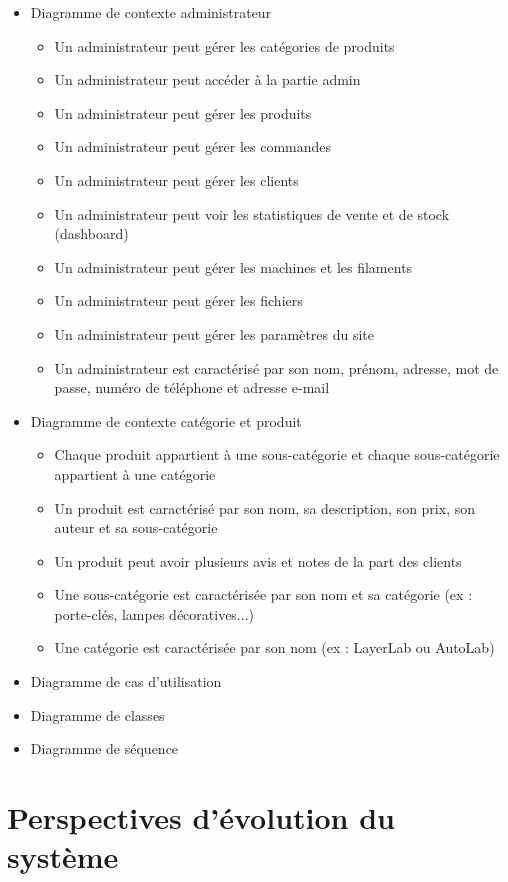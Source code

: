 \documentclass[12pt,a4paper]{article}
\begin{document}
\begin{itemize}
\item Diagramme de contexte administrateur 
\begin{itemize}[label=\textbullet]
    \item Un administrateur peut gérer les catégories de produits
    \item Un administrateur peut accéder à la partie admin 
    \item Un administrateur peut gérer les produits
    \item Un administrateur peut gérer les commandes
    \item Un administrateur peut gérer les clients
    \item Un administrateur peut voir les statistiques de vente et de stock (dashboard)
    \item Un administrateur peut gérer les machines et les filaments
    \item Un administrateur peut gérer les fichiers
    \item Un administrateur peut gérer les paramètres du site
    \item Un administrateur est caractérisé par son nom, prénom, adresse, mot de passe, numéro de téléphone et adresse e-mail
\end{itemize}

\item Diagramme de contexte catégorie et produit  
\begin{itemize}[label=\textbullet]
    \item Chaque produit appartient à une sous-catégorie et chaque sous-catégorie appartient à une catégorie
    \item Un produit est caractérisé par son nom, sa description, son prix, son auteur et sa sous-catégorie
    \item Un produit peut avoir plusieurs avis et notes de la part des clients
    \item Une sous-catégorie est caractérisée par son nom et sa catégorie (ex : porte-clés, lampes décoratives...)
    \item Une catégorie est caractérisée par son nom (ex : LayerLab ou AutoLab) 
\end{itemize}

\item Diagramme de cas d'utilisation
\item Diagramme de classes
\item Diagramme de séquence
\end{itemize}

\section{Perspectives d’évolution du système}
\end{document}
